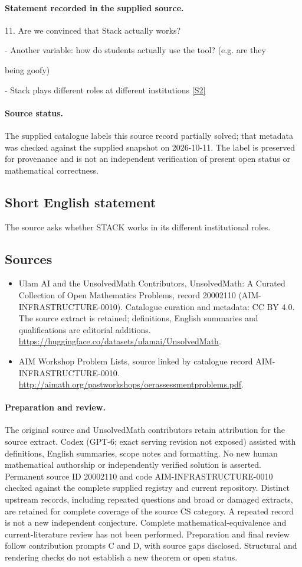 \documentclass[11pt]{article}
\begin{document}
\paragraph{Statement recorded in the supplied source.}
11. Are we convinced that Stack actually works?

- Another variable: how do students actually use the tool? (e.g. are they

being goofy)

- Stack plays different roles at different institutions \href{http://aimath.org/pastworkshops/oerassessmentproblems.pdf}{[S2]}
\paragraph{Source status.}
The supplied catalogue labels this source record partially solved; that metadata was checked against the supplied snapshot on 2026-10-11. The label is preserved for provenance and is not an independent verification of present open status or mathematical correctness.
\subsection{Short English statement}
The source asks whether STACK works in its different institutional roles.
\subsection{Sources}
\begin{itemize}
\item[S1] Ulam AI and the UnsolvedMath Contributors, UnsolvedMath: A Curated Collection of Open Mathematics Problems, record 20002110 (AIM-INFRASTRUCTURE-0010). Catalogue curation and metadata: CC BY 4.0. The source extract is retained; definitions, English summaries and qualifications are editorial additions.
\url{https://huggingface.co/datasets/ulamai/UnsolvedMath}.
\item[S2] AIM Workshop Problem Lists, source linked by catalogue record AIM-INFRASTRUCTURE-0010.
\url{http://aimath.org/pastworkshops/oerassessmentproblems.pdf}.
\end{itemize}
\paragraph{Preparation and review.}
The original source and UnsolvedMath contributors retain attribution for the source extract. Codex (GPT-6; exact serving revision not exposed) assisted with definitions, English summaries, scope notes and formatting. No new human mathematical authorship or independently verified solution is asserted. Permanent source ID 20002110 and code AIM-INFRASTRUCTURE-0010 checked against the complete supplied registry and current repository. Distinct upstream records, including repeated questions and broad or damaged extracts, are retained for complete coverage of the source CS category. A repeated record is not a new independent conjecture. Complete mathematical-equivalence and current-literature review has not been performed. Preparation and final review follow contribution prompts C and D, with source gaps disclosed. Structural and rendering checks do not establish a new theorem or open status.
\label{end:20002110}
\end{document}
